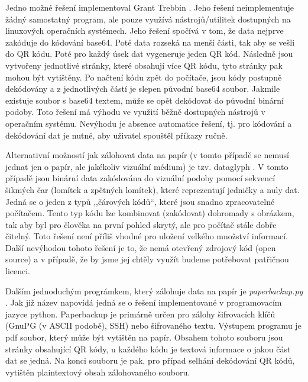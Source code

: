 \documentclass[conference]{IEEEtran}
\begin{document}
Jedno možné řešení implementoval Grant Trebbin \cite{GrantTrebbin}. Jeho řešení neimplementuje žádný samostatný program, ale pouze využívá nástrojů/utilitek dostupných na linuxových operačních systémech. Jeho řešení spočívá v tom, že data nejprve zakóduje do kódování base64. Poté data rozseká na menší části, tak aby se vešli do QR kódu. Poté pro každý úsek dat vygeneruje jeden QR kód. Následně jsou vytvořeny jednotlivé stránky, které obsahují více QR kódu, tyto stránky pak mohou být vytištěny. Po načtení kódu zpět do počítače, jsou kódy postupně dekódovány a z jednotlivých částí je slepen původní base64 soubor. Jakmile existuje soubor s base64 textem, může se opět dekódovat do původní binární podoby. Toto řešení má výhodu ve využití běžně dostupných nástrojů v operačním systému. Nevýhodu je absence automatice řešení, tj. pro kódování a dekódování dat je nutné, aby uživatel spouštěl příkazy ručně.

Alternativní možností jak zálohovat data na papír (v tomto případě se nemusí jednat jen o papír, ale jakékoliv vizuální médium) je tzv. dataglyph \cite{DataGlyphsFreePatenstsOnline}\cite{dataglyphs}. V tomto případě jsou binární data zakódována do vizuální podoby pomocí sekvencí šikmých čar (lomítek a zpětných lomítek), které reprezentují jedničky a nuly dat. Jedná se o jeden z typů ,,čárových kódů``, které jsou snadno zpracovatelné počítačem. Tento typ kódu lze kombinovat (zakódovat) dohromady s obrázkem, tak aby byl pro člověka na první pohled skrytý, ale pro počítač stále dobře čitelný. Toto řešení není příliš vhodné pro uložení velkého množství informací. Další nevýhodou tohoto řešení je to, že nemá otevřený zdrojový kód (open source) a v případě, že by jsme jej chtěly využít budeme potřebovat patřičnou licenci.

Dalším jednoduchým prográmkem, který zálohuje data na papír je \emph{paperbackup.py} \cite{PaperBackup}. Jak již název napovídá jedná se o řešení implementované v programovacím jazyce python. Paperbackup je primárně určen pro zálohy šifrovacích klíčů (GnuPG (v ASCII podobě), SSH) nebo šifrovaného textu. Výstupem programu je pdf soubor, který může být vytištěn na papír. Obsahem tohoto souboru jsou stránky obsahující QR kódy, u každého kódu je textová informace o jakou část dat se jedná. Na konci souboru je pak, pro případ selhání dekódování QR kódů, vytištěn plaintextový obsah zálohovaného souboru. 
\end{document}
